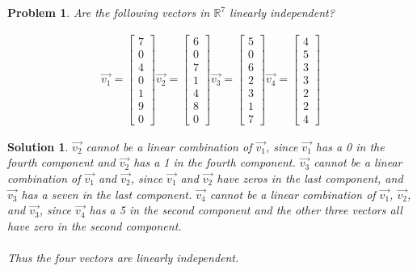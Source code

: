 \documentclass{article}
\newtheorem{problem}{Problem}
\newtheorem*{solution}{Solution}
\begin{document}
\begin{problem}
Are the following vectors in $\mathbb{R}^7$ linearly independent?

\begin{align*}
\vec{v_{1}} = \begin{bmatrix} 7 \\ 0 \\ 4 \\ 0 \\ 1 \\ 9 \\ 0 \end{bmatrix}
\vec{v_{2}} = \begin{bmatrix} 6 \\ 0 \\ 7 \\ 1 \\ 4 \\ 8 \\ 0 \end{bmatrix}
\vec{v_{3}} = \begin{bmatrix} 5 \\ 0 \\ 6 \\ 2 \\ 3 \\ 1 \\ 7 \end{bmatrix}
\vec{v_{4}} = \begin{bmatrix} 4 \\ 5 \\ 3 \\ 3 \\ 2 \\ 2 \\ 4 \end{bmatrix}
\end{align*}
\end{problem}

\begin{solution}
$\vec{v_{2}}$ cannot be a linear combination of $\vec{v_{1}}$, since $\vec{v_{1}}$ has a 0 in the fourth component and $\vec{v_{2}}$ has a 1 in the fourth component. $\vec{v_{3}}$ cannot be a linear combination of $\vec{v_{1}}$ and $\vec{v_{2}}$, since $\vec{v_{1}}$ and $\vec{v_{2}}$ have zeros in the last component, and $\vec{v_{3}}$ has a seven in the last component. $\vec{v_{4}}$ cannot be a linear combination of $\vec{v_{1}}$, $\vec{v_{2}}$, and $\vec{v_{3}}$, since $\vec{v_{4}}$ has a 5 in the second component and the other three vectors all have zero in the second component. \\
\\
Thus the four vectors are linearly independent.
\end{solution}
\end{document}

